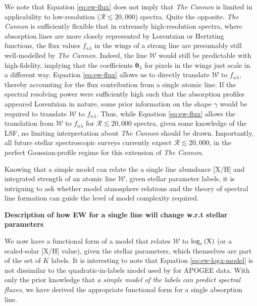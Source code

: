 \documentclass[useAMS,usenatbib]{mn2e}
\newcommand\tc{\textit{The Cannon}}
\newcommand\cv{{\boldsymbol\theta}_\lambda}
\begin{document}
We note that Equation \ref{eq:ew-flux} does not imply that \tc{} is limited in applicability to low-resolution ($\mathcal{R} \lesssim 20,000$) spectra. Quite the opposite. \tc{} is sufficiently flexible that in extremely high-resolution spectra, where absorption lines are more closely represented by Lorentzian or Hertzting functions, the flux values $f_{n\lambda}$ in the wings of a strong line are presumably still well-modelled by \tc{}. Indeed, the line $\mathcal{W}$ would still be predictable with high-fidelity, implying that the coefficients $\cv$ for pixels in the wings just scale in a different way. Equation \ref{eq:ew-flux} allows us to directly translate $\mathcal{W}$ to $f_{n\lambda}$, thereby accounting for the flux contribution from a single atomic line. If the spectral resolving power were sufficiently high such that the absorption profiles appeared Lorentzian in nature, some prior information on the shape $\gamma$ would be required to translate $\mathcal{W}$ to $f_{n\lambda}$. Thus, while Equation \ref{eq:ew-flux} allows the translation from $\mathcal{W}$ to $f_{n\lambda}$ for $\mathcal{R} \lesssim 20,000$ spectra, given some knowledge of the LSF, no limiting interpretation about \tc{} should be drawn. Importantly, all future stellar spectroscopic surveys  currently expect $\mathcal{R} \lesssim 20,000$, in the perfect Gaussian-profile regime for this extension of \tc{}.


Knowing that a simple model can relate the a single line abundance [X/H] and integrated strength of an atomic line $\mathcal{W}$, given stellar parameter labels, it is intriguing to ask whether model atmosphere relations and the theory of spectral line formation can guide the level of model complexity required.

\textbf{Description of how EW for a single line will change w.r.t stellar parameters}

We now have a functional form of a model that relates $\mathcal{W}$ to $\log_\epsilon\left({\textrm X}\right)$ (or a scaled-solar [X/H] value), given the stellar parameters, which themselves are part of the set of $K$ labels. It is interesting to note that Equation \ref{eq:ew-logx-model} is not dissimilar to the quadratic-in-labels model used by \citet{Ness15a} for APOGEE data. With only the prior knowledge that \textit{a simple model of the labels can predict spectral fluxes}, we have derived the appropriate functional form for a single absorption line.
\end{document}
